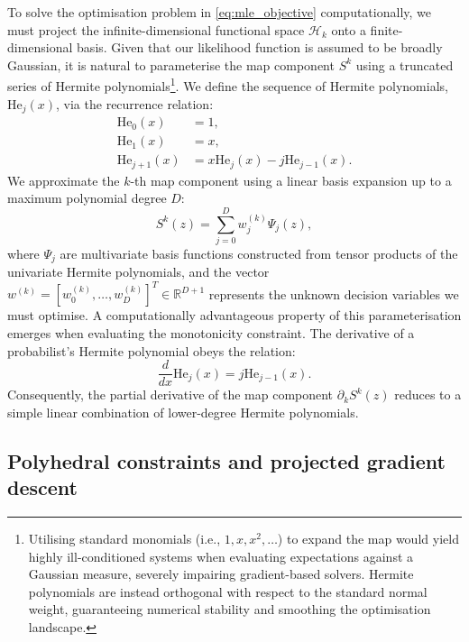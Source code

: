 To solve the optimisation problem in \eqref{eq:mle_objective} computationally, we must project the infinite-dimensional functional space $\mathcal{H}_k$ onto a finite-dimensional basis. Given that our likelihood function is assumed to be broadly Gaussian, it is natural to parameterise the map component $S^k$ using a truncated series of Hermite polynomials\footnote{Utilising standard monomials (i.e., $1, x, x^2, \dots$) to expand the map would yield highly ill-conditioned systems when evaluating expectations against a Gaussian measure, severely impairing gradient-based solvers. Hermite polynomials are instead orthogonal with respect to the standard normal weight, guaranteeing numerical stability and smoothing the optimisation landscape.}. We define the sequence of Hermite polynomials, $\text{He}_j(x)$, via the recurrence relation:
\begin{align*}
    \text{He}_0(x) &= 1, \\
    \text{He}_1(x) &= x, \\
    \text{He}_{j+1}(x) &= x \text{He}_j(x) - j \text{He}_{j-1}(x).
\end{align*}
We approximate the $k$-th map component using a linear basis expansion up to a maximum polynomial degree $D$:
\begin{equation}
    S^k(z) = \sum_{j=0}^D w_j^{(k)} \Psi_j(z),
    \label{eq:hermite_expansion}
\end{equation}
where $\Psi_j$ are multivariate basis functions constructed from tensor products of the univariate Hermite polynomials, and the vector $w^{(k)} = [w_0^{(k)}, \dots, w_D^{(k)}]^T \in \mathbb{R}^{D+1}$ represents the unknown decision variables we must optimise. A computationally advantageous property of this parameterisation emerges when evaluating the monotonicity constraint. The derivative of a probabilist's Hermite polynomial obeys the relation:
\begin{equation}
    \frac{d}{dx} \text{He}_j(x) = j \text{He}_{j-1}(x).
    \label{eq:hermite_derivative}
\end{equation}
Consequently, the partial derivative of the map component $\partial_k S^k(z)$ reduces to a simple linear combination of lower-degree Hermite polynomials. 

\subsection{Polyhedral constraints and projected gradient descent}

